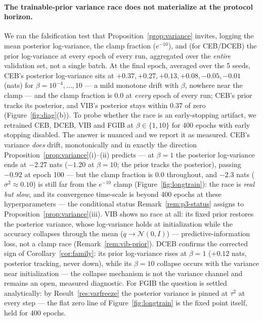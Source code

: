 \documentclass{article} %
\newcommand{\Ncal}{\mathcal{N}}
\begin{document}
\paragraph{The trainable-prior variance race does not materialize at the protocol horizon.}
We ran the falsification test that Proposition~\ref{prop:variance} invites, logging the
mean posterior log-variance, the clamp fraction ($e^{-10}$), and (for CEB/DCEB) the
prior log-variance at every epoch of every run, aggregated over the \emph{entire}
validation set, not a single batch. At the final epoch, averaged over the 5 seeds, CEB's
posterior log-variance sits at $+0.37, +0.27, +0.13, +0.08, -0.05, -0.01$ (nats) for
$\beta = 10^{-4}, \dots, 10$ --- a mild monotone drift with $\beta$, nowhere near the
clamp --- and the clamp fraction is $0.0$ at \emph{every} epoch of
every run; CEB's prior tracks its posterior, and VIB's posterior stays within $0.37$
of zero (Figure~\ref{fig:diag}(b)). To probe whether the race is an early-stopping
artifact, we retrained CEB, DCEB, VIB and FGIB at
$\beta \in \{1, 10\}$ for 400 epochs with early stopping disabled. The answer is
nuanced and we report it as measured. CEB's variance \emph{does} drift, monotonically
and in exactly the direction Proposition~\ref{prop:variance}(i)--(ii) predicts --- at
$\beta=1$ the posterior log-variance ends at $-2.27$ nats ($-1.20$ at $\beta=10$; the
prior tracks the posterior), passing $-0.92$ at epoch 100 --- but the clamp fraction is
$0.0$ throughout, and $-2.3$ nats ($\sigma^2 \approx 0.10$) is still far from the
$e^{-10}$ clamp (Figure~\ref{fig:longtrain}): the race is \emph{real but slow}, and its
convergence time-scale is beyond 400 epochs at these hyperparameters --- the
conditional status Remark~\ref{rem:p3-status} assigns to
Proposition~\ref{prop:variance}(iii). VIB shows no race at all: its fixed prior
restores the posterior variance, whose log-variance holds at initialization while the
accuracy collapses through the mean ($q \to \Ncal(0,I)$) --- predictive-information
loss, not a clamp race (Remark~\ref{rem:vib-prior}). DCEB confirms the corrected sign
of Corollary~\ref{cor:family}: its prior log-variance rises at $\beta=1$ ($+0.12$ nats,
posterior tracking, never down), while its $\beta=10$ collapse occurs with the variance
near initialization --- the collapse mechanism is not the variance channel and remains
an open, measured diagnostic. For FGIB the question is
settled analytically: by Result~\ref{res:varfreeze} the
posterior variance is pinned at $\tau^2$ at every step --- the flat zero line of
Figure~\ref{fig:longtrain} is the fixed point itself, held for 400 epochs.
\end{document}
